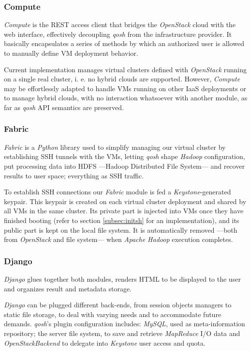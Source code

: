\documentclass{sig-alternate}
\begin{document}
\subsubsection{Compute}
\noindent \emph{Compute} is the REST access client that bridges the \emph{OpenStack} cloud with the web interface, effectively decoupling \emph{qosh} from the infrastructure provider. It basically encapsulates a series of methods by which an authorized user is allowed to manually define VM deployment behavior.

Current implementation manages virtual clusters defined with \emph{OpenStack} running on a single real cluster, i. e. no hybrid clouds are supported. However, \emph{Compute} may be effortlessly adapted to handle VMs running on other IaaS deployments or to manage hybrid clouds, with no interaction whatsoever with another module, as far as \emph{qosh} API semantics are preserved.


\subsubsection{Fabric}
\noindent \emph{Fabric} is a \emph{Python} library used to simplify managing our virtual cluster by establishing SSH tunnels with the VMs, letting \emph{qosh} shape \emph{Hadoop} configuration, put processing data into HDFS ---Hadoop Distributed File System--- and recover results to user space; everything as SSH traffic.

To establish SSH connections our \emph{Fabric} module is fed a \emph{Keystone}-generated keypair. This keypair is created on each virtual cluster deployment and shared by all VMs in the same cluster. Its private part is injected into VMs once they have finished booting (refer to section \ref{subsec:initsh} for an implementation), and its public part is kept on the local file system. It is automatically removed ---both from \emph{OpenStack} and file system--- when \emph{Apache Hadoop} execution completes.


\subsubsection{Django}
\noindent \emph{Django} glues together both modules, renders HTML to be displayed to the user and organizes result and metadata storage.

\emph{Django} can be plugged different back-ends, from session objects managers to static file storage, to deal with varying needs and to accommodate future demands. \emph{qosh}'s plugin configuration includes: \emph{MySQL}, used as meta-information repository; the server file system, to save and retrieve \emph{MapReduce} I/O data and \emph{OpenStackBackend} to delegate into \emph{Keystone} user access and quota.
\end{document}
